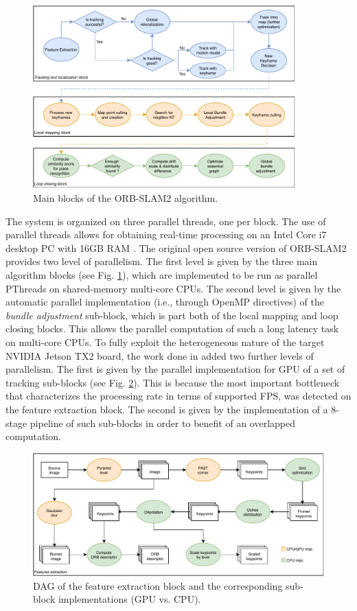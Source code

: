 \begin{figure}
	\centering
	\includegraphics[width=0.90\textwidth]{images/orb-slam-overview2.pdf}
	\caption{Main blocks of the ORB-SLAM2 algorithm.}
	\label{fig:orbslam}
\end{figure}


The system is organized on three parallel threads, one per block. The use of parallel threads allows for obtaining real-time processing on an Intel Core i7 desktop PC with 16GB RAM \cite{murORB2}. The original open source version of ORB-SLAM2 provides two level of parallelism. The first level is given by the three main algorithm blocks (see Fig. \ref{fig:orbslam}), which are implemented to be run as parallel PThreads on shared-memory multi-core CPUs. The second level is given by the automatic parallel implementation (i.e., through OpenMP directives) of the \textit{bundle adjustment} sub-block, which is part both of the local mapping and loop closing blocks. This allows the parallel computation of such a long latency task on multi-core CPUs.
To fully exploit the heterogeneous nature of the target NVIDIA Jetson TX2 board, the work done in \cite{iros2019} added two further levels of parallelism. The first is given by the parallel implementation for GPU of a set of tracking sub-blocks (see Fig. \ref{FIG:FE-DAG}). This is because the most important bottleneck that characterizes the processing rate in terms of supported FPS, was detected on the feature extraction block. The second is given by the implementation of a 8-stage pipeline of such sub-blocks in order to benefit of an overlapped computation.

\begin{figure}[t!]
	\centering
	\includegraphics[width=\linewidth]{images/orb-feature.pdf}
	\caption{DAG of the feature extraction block and the corresponding sub-block implementations (GPU vs. CPU).}\label{FIG:FE-DAG}
\end{figure}



